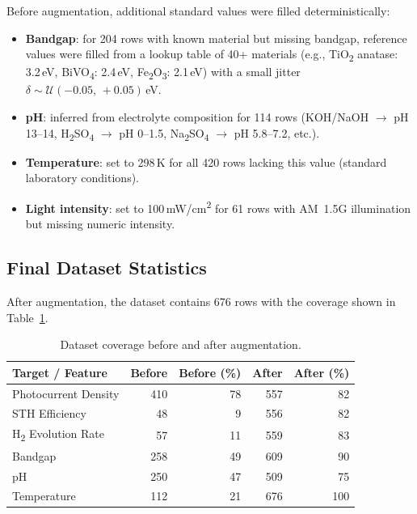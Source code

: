 Before augmentation, additional standard values were filled deterministically:
\begin{itemize}
  \item \textbf{Bandgap}: for 204 rows with known material but missing bandgap,
        reference values were filled from a lookup table of 40+ materials
        (e.g., TiO\textsubscript{2} anatase: 3.2\,eV, BiVO\textsubscript{4}: 2.4\,eV,
        Fe\textsubscript{2}O\textsubscript{3}: 2.1\,eV) with a small jitter
        $\delta \sim \mathcal{U}(-0.05,\,+0.05)$\,eV.
  \item \textbf{pH}: inferred from electrolyte composition for 114 rows
        (KOH/NaOH $\to$ pH 13--14, H\textsubscript{2}SO\textsubscript{4} $\to$ pH 0--1.5,
        Na\textsubscript{2}SO\textsubscript{4} $\to$ pH 5.8--7.2, etc.).
  \item \textbf{Temperature}: set to 298\,K for all 420 rows lacking this value
        (standard laboratory conditions).
  \item \textbf{Light intensity}: set to 100\,mW/cm\textsuperscript{2} for 61 rows
        with AM~1.5G illumination but missing numeric intensity.
\end{itemize}

\subsection{Final Dataset Statistics}

After augmentation, the dataset contains 676 rows with the coverage shown in
Table~\ref{tab:augmented}.

\begin{table}[h]
\centering
\caption{Dataset coverage before and after augmentation.}
\label{tab:augmented}
\begin{tabular}{lrrrr}
\toprule
Target / Feature & Before & Before (\%) & After & After (\%) \\
\midrule
Photocurrent Density  & 410 & 78 & 557 & 82 \\
STH Efficiency        & 48  & 9  & 556 & 82 \\
H\textsubscript{2} Evolution Rate & 57 & 11 & 559 & 83 \\
Bandgap               & 258 & 49 & 609 & 90 \\
pH                    & 250 & 47 & 509 & 75 \\
Temperature           & 112 & 21 & 676 & 100 \\
\bottomrule
\end{tabular}
\end{table}

